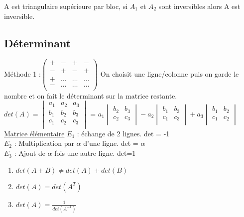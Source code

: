 \documentclass[../main.tex]{subfiles}
\begin{document}
A est triangulaire supérieure par bloc, si $A_1$ et $A_2$ sont inversibles alors A est inversible.

\subsection{Déterminant}
Méthode 1 :$\begin{pmatrix}
    + & -&+&-\\
    -&+&-&+\\
    + &\dots & \dots & \dots \\
    - & \dots & \dots & \dots\\
\end{pmatrix}$
On choisit une ligne/colonne puis on garde le nombre et on fait le déterminant sur la matrice restante.\\
$det(A) = \begin{vmatrix}
    a_1 & a_2 & a_3\\
    b_1 & b_2 & b_3\\
    c_1 & c_2 & c_3\\
\end{vmatrix}$
 = $a_1 \begin{vmatrix}
     b_2 & b_3\\
     c_2 & c_3\\
 \end{vmatrix} - a_2 \begin{vmatrix}
     b_1 & b_3\\
     c_1 & c_3\\
 \end{vmatrix} + a_3 \begin{vmatrix}
     b_1 & b_2\\
     c_1 & c_2\\
 \end{vmatrix}$ \\

\quad \underline{Matrice élémentaire}
$E_1$ : échange de 2 lignes. det = -1\\
$E_2$ : Multiplication par $\alpha$ d'une ligne. det = $\alpha$\\
$E_3$ : Ajout de $\alpha$ fois une autre ligne. det=1\\

\begin{enumerate}
    \item $det(A+B) \neq det(A)+det(B)$\\
    \item $det(A) = det(A^T)$\\
    \item $det(A) = \frac{1}{det(A^{-1})}$
\end{enumerate}
\end{document}
